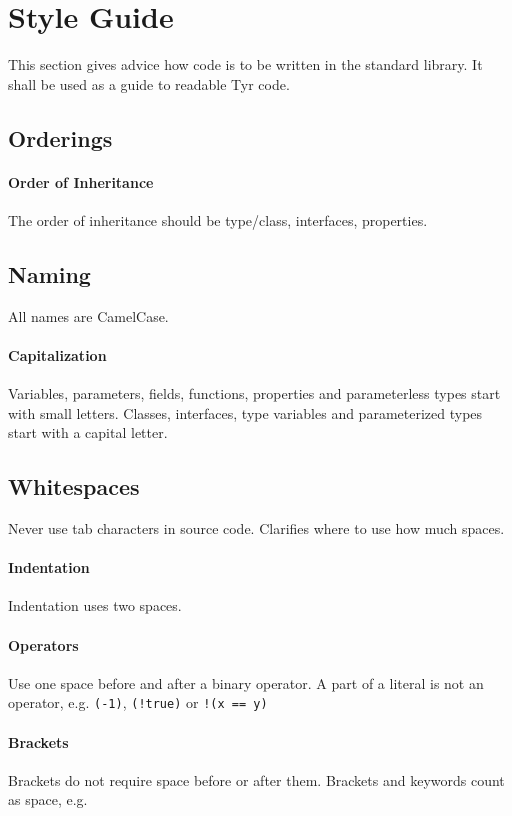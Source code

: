 \section{Style Guide}

This section gives advice how code is to be written in the standard library.
It shall be used as a guide to readable Tyr code.

\subsection{Orderings}

\paragraph{Order of Inheritance}
The order of inheritance should be type/class, interfaces, properties.


\subsection{Naming}

All names are CamelCase.

\paragraph{Capitalization}

Variables, parameters, fields, functions, properties and parameterless types start with small letters.
Classes, interfaces, type variables and parameterized types start with a capital letter.

\subsection{Whitespaces}
Never use tab characters in source code.
Clarifies where to use how much spaces.

\paragraph{Indentation}
Indentation uses two spaces.

\paragraph{Operators}
Use one space before and after a binary operator.
A part of a literal is not an operator, e.g. \verb+(-1)+, \verb+(!true)+ or \verb+!(x == y)+

\paragraph{Brackets}
Brackets do not require space before or after them.
Brackets and keywords count as space, e.g. 